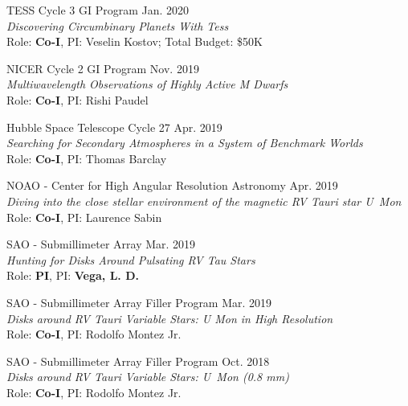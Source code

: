 \documentclass[12pt]{article}
\begin{document}
\begin{etaremune}
\item TESS Cycle 3 GI Program  \hfill Jan. 2020 \\
\textit{Discovering Circumbinary Planets With Tess} \\ Role: \textbf{Co-I}, PI: Veselin Kostov; Total Budget: \$50K

\item NICER Cycle 2 GI Program \hfill Nov. 2019 \\
\textit{Multiwavelength Observations of Highly Active M Dwarfs} \\ Role: \textbf{Co-I}, PI: Rishi Paudel

\item Hubble Space Telescope Cycle 27 \hfill Apr. 2019 \\
\textit{Searching for Secondary Atmospheres in a System of Benchmark Worlds} \\ Role: \textbf{Co-I}, PI: Thomas Barclay

\item NOAO - Center for High Angular Resolution Astronomy \hfill Apr. 2019\\
\textit{Diving into the close stellar environment of the magnetic
RV Tauri star U~Mon} \\ Role: \textbf{Co-I}, PI: Laurence Sabin

\item SAO - Submillimeter Array \hfill Mar. 2019 \\
 \textit{Hunting for Disks Around Pulsating RV Tau Stars} \\ Role: \textbf{PI}, PI: \textbf{Vega, L. D.}

\item SAO - Submillimeter Array Filler Program \hfill Mar. 2019 \\
\textit{Disks around RV Tauri Variable Stars: U Mon in High Resolution} \\ Role: \textbf{Co-I}, PI: Rodolfo Montez Jr.

\item SAO - Submillimeter Array Filler Program \hfill Oct. 2018 \\
\textit{Disks around RV Tauri Variable Stars: U~Mon (0.8 mm)} \\ Role: \textbf{Co-I}, PI: Rodolfo Montez Jr.



\end{etaremune}
\end{document}

